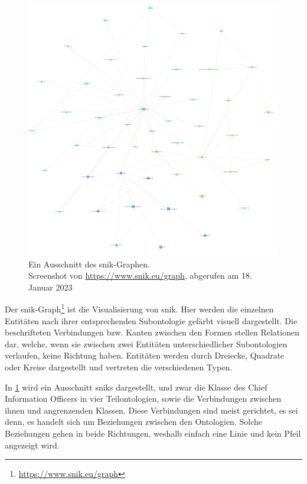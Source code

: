 \begin{figure}[htbp!]
  \centering
  \includegraphics[width=\textwidth, height=\textheight, keepaspectratio]{Images/snik-graph.png}
  \caption[Ausschnitt SNIK-Graph]{Ein Ausschnitt des \ac{snik}-Graphen.\\Screenshot von \url{https://www.snik.eu/graph}, abgerufen am 18. Januar 2023}
  \label{fig:snik-graph}
\end{figure}

Der \ac{snik}-Graph\footnote{\url{https://www.snik.eu/graph}} ist die Visualisierung von \ac{snik}.
Hier werden die einzelnen Entitäten nach ihrer entsprechenden Subontologie gefärbt visuell dargestellt.
Die beschrifteten Verbindungen bzw. Kanten zwischen den Formen stellen Relationen dar,
welche, wenn sie zwischen zwei Entitäten unterschiedlicher Subontologien verlaufen, keine Richtung haben.
Entitäten werden durch Dreiecke, Quadrate oder Kreise dargestellt und vertreten die verschiedenen Typen.

In \cref{fig:snik-graph} wird ein Ausschnitt \ac{snik}s dargestellt, und zwar die Klasse des Chief Information Officers in vier Teilontologien,
sowie die Verbindungen zwischen ihnen und angrenzenden Klassen.
Diese Verbindungen sind meist gerichtet, es sei denn, es handelt sich um Beziehungen zwischen den Ontologien.
Solche Beziehungen gehen in beide Richtungen, weshalb einfach eine Linie und kein Pfeil angezeigt wird.

